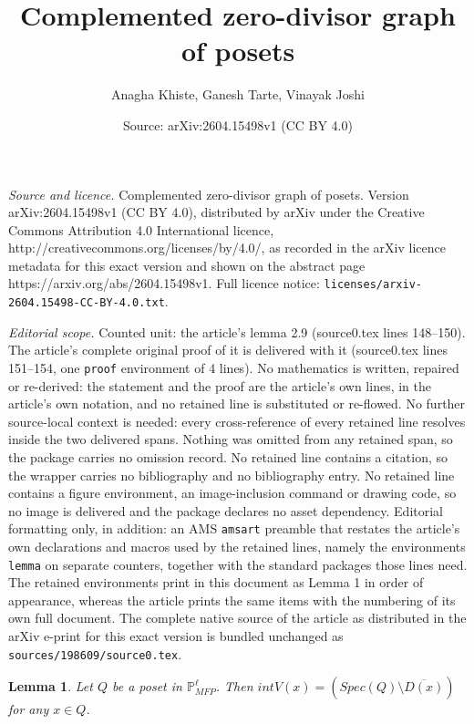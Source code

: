 \documentclass[10pt,a4paper]{amsart}
\title{Complemented zero-divisor graph of posets}
\author{Anagha Khiste, Ganesh Tarte, Vinayak Joshi}
\date{Source: arXiv:2604.15498v1 (CC BY 4.0)}
\newtheorem{lemma}{Lemma}
\begin{document}
\maketitle

\noindent\emph{Source and licence.} Complemented zero-divisor graph of posets. Version arXiv:2604.15498v1 (CC BY 4.0), distributed by arXiv under the Creative Commons Attribution 4.0 International licence, http://creativecommons.org/licenses/by/4.0/, as recorded in the arXiv licence metadata for this exact version and shown on the abstract page https://arxiv.org/abs/2604.15498v1. Full licence notice: \texttt{licenses/arxiv-2604.15498-CC-BY-4.0.txt}.\par\smallskip

\noindent\textit{Editorial scope.} Counted unit: the article's lemma 2.9 (source0.tex lines 148--150). The article's complete original proof of it is delivered with it (source0.tex lines 151--154, one \texttt{proof} environment of 4 lines). No mathematics is written, repaired or re-derived: the statement and the proof are the article's own lines, in the article's own notation, and no retained line is substituted or re-flowed.  No further source-local context is needed: every cross-reference of every retained line resolves inside the two delivered spans.  Nothing was omitted from any retained span, so the package carries no omission record.  No retained line contains a citation, so the wrapper carries no bibliography and no bibliography entry.  No retained line contains a figure environment, an image-inclusion command or drawing code, so no image is delivered and the package declares no asset dependency.  Editorial formatting only, in addition: an AMS \texttt{amsart} preamble that restates the article's own declarations and macros used by the retained lines, namely the environments \texttt{lemma} on separate counters, together with the standard packages those lines need.  The retained environments print in this document as Lemma 1 in order of appearance, whereas the article prints the same items with the numbering of its own full document.  The complete native source of the article as distributed in the arXiv e-print for this exact version is bundled unchanged as \texttt{sources/198609/source0.tex}.
\begin{lemma}\label{2.9} 
	Let $Q$ be a poset in $\mathbb{P}^{\ell}_{MFP}$. Then $int V(x)=(Spec(Q)\setminus \overline{D(x)})$ for any $x\in Q$.
\end{lemma}
\end{document}
